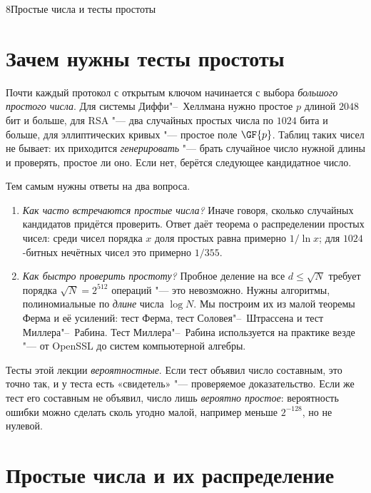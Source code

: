 \begin{lecture}{8}{Простые числа и тесты простоты}

\section{Зачем нужны тесты простоты}

Почти каждый протокол с открытым ключом начинается с выбора \emph{большого простого числа}.
Для системы Диффи"--~Хеллмана нужно простое $p$ длиной $2048$ бит и больше, для RSA "--- два
случайных простых числа по $1024$ бита и больше, для эллиптических кривых "--- простое поле
$\GF{p}$. Таблиц таких чисел не бывает: их приходится \emph{генерировать} "--- брать случайное
число нужной длины и проверять, простое ли оно. Если нет, берётся следующее кандидатное число.

Тем самым нужны ответы на два вопроса.
\begin{enumerate}
  \item \emph{Как часто встречаются простые числа?} Иначе говоря, сколько случайных кандидатов
    придётся проверить. Ответ даёт теорема о распределении простых чисел: среди чисел порядка
    $x$ доля простых равна примерно $1/\ln x$; для $1024$-битных нечётных чисел это примерно
    $1/355$.
  \item \emph{Как быстро проверить простоту?} Пробное деление на все $d \le \sqrt N$ требует
    порядка $\sqrt N = 2^{512}$ операций "--- это невозможно. Нужны алгоритмы, полиномиальные по
    \emph{длине} числа $\log N$. Мы построим их из малой теоремы Ферма и её усилений:
    тест Ферма, тест Соловея"--~Штрассена и тест Миллера"--~Рабина. Тест Миллера"--~Рабина
    используется на практике везде "--- от OpenSSL до систем компьютерной алгебры.
\end{enumerate}

Тесты этой лекции \emph{вероятностные}. Если тест объявил число составным, это точно так, и
у теста есть «свидетель» "--- проверяемое доказательство. Если же тест его составным не
объявил, число лишь \emph{вероятно простое}: вероятность ошибки можно сделать сколь угодно
малой, например меньше $2^{-128}$, но не нулевой.

\section{Простые числа и их распределение}


\end{lecture}
